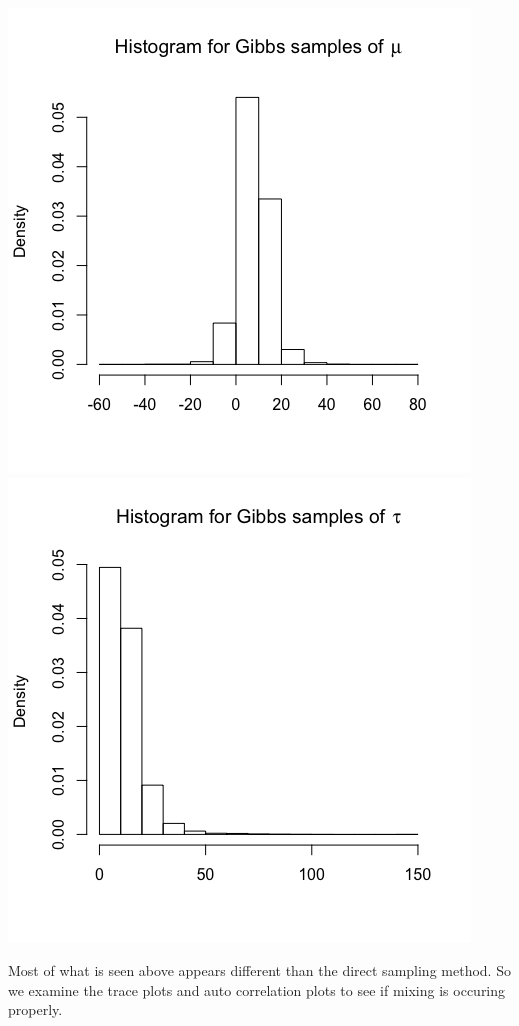 \documentclass[a4paper, 9pt]{article}
\begin{document}
\begin{center}
    \includegraphics[scale = 0.5]{gibbs_mu.png}
    \includegraphics[scale = 0.5]{gibbs_tau.png}
\end{center}

Most of what is seen above appears different than the direct sampling method. So we examine the trace plots and auto correlation plots to see if mixing is occuring properly.
\end{document}
